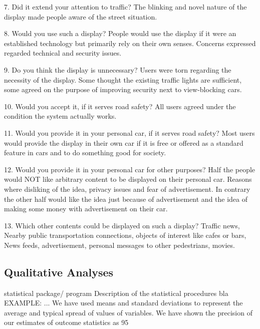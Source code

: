 7. Did it extend your attention to traffic?
The blinking and novel nature of the display made people aware of the street situation.

8. Would you use such a display?
People would use the display if it were an established technology but primarily rely on their own senses. Concerns expressed regarded technical and security issues.

9. Do you think the display is unnecessary?
Users were torn regarding the necessity of the display. Some thought the existing traffic lights are sufficient, some agreed on the purpose of improving security next to view-blocking cars.

10. Would you accept it, if it serves road safety? 
All users agreed under the condition the system actually works.

11. Would you provide it in your personal car, if it serves road safety?
Most users would provide the display in their own car if it is free or offered as a standard feature in cars and to do something good for society.

12. Would you provide it in your personal car for other purposes?
Half the people would NOT like arbitrary content to be displayed on their personal car.
Reasons where disliking of the idea, privacy issues and fear of advertisement.
In contrary the other half would like the idea just because of advertisement and the idea of making some money with advertisement on their car.

13. Which other contents could be displayed on such a display?
Traffic news, Nearby public transportation connections, objects of interest like cafes or bars, News feeds, advertisement, personal messages to other pedestrians, movies.


\subsection{Qualitative Analyses}

statistical package/ program
Description of the statistical procedures
bla EXAMPLE: ... We have used means and standard deviations to represent the average and typical spread of values of variables. We have shown the precision of our estimates of outcome statistics as 95%

